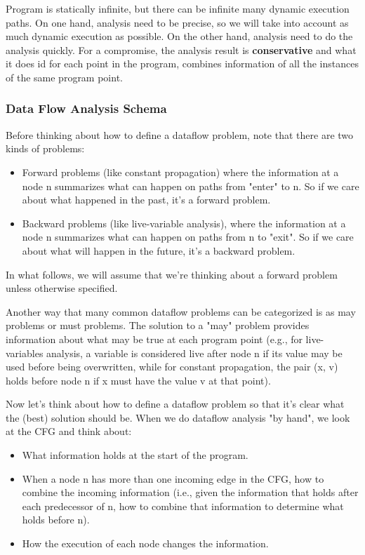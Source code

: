 Program is statically infinite, but there can be infinite many dynamic execution paths. On one hand, analysis
 need to be precise, so we will take into account as much dynamic execution as possible. On the other hand, analysis
 need to do the analysis quickly. For a compromise, the analysis result is \textbf{conservative} and what it does id for each 
 point in the program, combines information of all the instances of the same program point.





\subsubsection{Data Flow Analysis Schema}
Before thinking about how to define a dataflow problem, note that there are two kinds of problems:
\begin{itemize}
    \item Forward problems (like constant propagation) where the information at a node n summarizes what can happen on paths from "enter" to n. So if we care about what happened in the past, it's a forward problem.
    \item Backward problems (like live-variable analysis), where the information at a node n summarizes what can happen on paths from n to "exit". So if we care about what will happen in the future, it's a backward problem.
\end{itemize}    

In what follows, we will assume that we're thinking about a forward problem unless otherwise specified.
 
Another way that many common dataflow problems can be categorized is as may problems or must problems. 
The solution to a "may" problem provides information about what may be true at each program point (e.g., 
for live-variables analysis, a variable is considered live after node n if its value may be used before 
being overwritten, while for constant propagation, the pair (x, v) holds before node n if x must have the value v at that point).

Now let's think about how to define a dataflow problem so that it's clear what the (best) solution should be. 
When we do dataflow analysis "by hand", we look at the CFG and think about:

\begin{itemize}
    \item What information holds at the start of the program.
    \item When a node n has more than one incoming edge in the CFG, how to combine the incoming 
    information (i.e., given the information that holds after each predecessor of n, how to 
    combine that information to determine what holds before n).
    \item How the execution of each node changes the information.
\end{itemize}    

